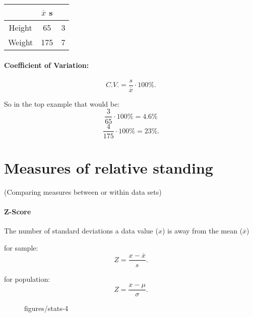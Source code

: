 \documentclass{book}
\begin{document}
\begin{table}[htbp]
    \centering
    \begin{tabular}{c|c|c}
        \toprule
        & $\overline{x}$ s \\
        \midrule
        Height & 65 & 3 \\
        \midrule
        Weight & 175 & 7 \\
        \bottomrule
    \end{tabular}
\end{table}

\paragraph{Coefficient of Variation:}
\[ C.V. = \frac{s}{\overline{x}}\cdot 100\% .\] 

So in the top example that would be:
\[\frac{3}{65}\cdot 100\% = 4.6\% \]
\[\frac{4}{175}\cdot 100\% = 23\% .\] 

\section{Measures of relative standing}
(Comparing measures between or within data sets)

\paragraph{Z-Score} The number of standard deviations a data value ($x$) is away from the mean ($\overline{x}$)

for sample: \[
Z=\frac{x- \overline{x}}{s}
.\] 

for population: \[
    Z=\frac{x-\mu}{\sigma}
.\] 


\begin{figure}[ht]
    \centering
    \caption{figures/stats-4}
    \label{fig:stats-4}
\end{figure}

\end{document}
